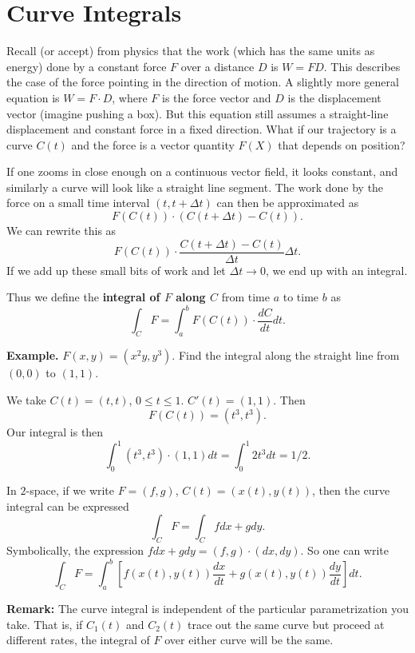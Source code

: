 \documentclass{article}
\begin{document}

\section*{Curve Integrals}

Recall (or accept) from physics that the work 
(which has the same units as energy) done by a constant force $F$ over a distance $D$ is 
$W=FD$. This describes the case of the force pointing in the direction
of motion. A slightly more general equation is $W = F \cdot D$, where
$F$ is the force vector and $D$ is the displacement vector (imagine pushing a box). But this 
equation still assumes a straight-line displacement and constant force in a fixed direction.
What if our trajectory is a curve $C(t)$ and the force is a vector quantity $F(X)$ that depends
on position?

If one zooms in close enough on a continuous vector field, it looks
constant, and similarly a curve will look like a straight line segment.
The work done by the force on a small time interval $(t, t + \Delta t)$ can then be approximated as 
\[F(C(t))\cdot (C(t+\Delta t)-C(t)).\]
We can rewrite this as 
\[F(C(t))\cdot \frac{C(t+\Delta t) - C(t)}{\Delta t}\Delta t.\]
If we add up these small bits of work and let $\Delta t \to 0$, we end
up with an integral.

Thus we define the \textbf{integral of $F$ along $C$} from time $a$ to time $b$ as 
\[\int_C F = \int_a^b F(C(t))\cdot \frac{dC}{dt} dt.\]

\textbf{Example.} $F(x,y) = (x^2y, y^3)$. Find the integral along the straight line
from $(0,0)$ to $(1,1)$.

We take $C(t) = (t,t)$, $0 \leq t \leq 1$. $C'(t) = (1,1)$. Then 
\[F(C(t)) = (t^3,t^3).\]
Our integral is then
\[\int_0^1 (t^3,t^3)\cdot (1,1)dt = \int_0^1 2t^3 dt = 1/2.\]

In $2$-space, if we write $F = (f,g)$, $C(t) = (x(t),y(t))$, then the curve integral
can be expressed
\[\int_C F = \int_C fdx + gdy.\]
Symbolically, the expression $fdx + gdy = (f,g)\cdot (dx,dy)$. So one can write
\[\int_C F = \int_a^b \left[ f(x(t),y(t))\frac{dx}{dt} + g(x(t),y(t))\frac{dy}{dt}\right]dt.\]

\textbf{Remark:} The curve integral is independent of the particular 
parametrization you take. That is, if $C_1(t)$ and $C_2(t)$ trace out the same
curve but proceed at different rates, the integral of $F$ over either
curve will be the same.
\end{document}
